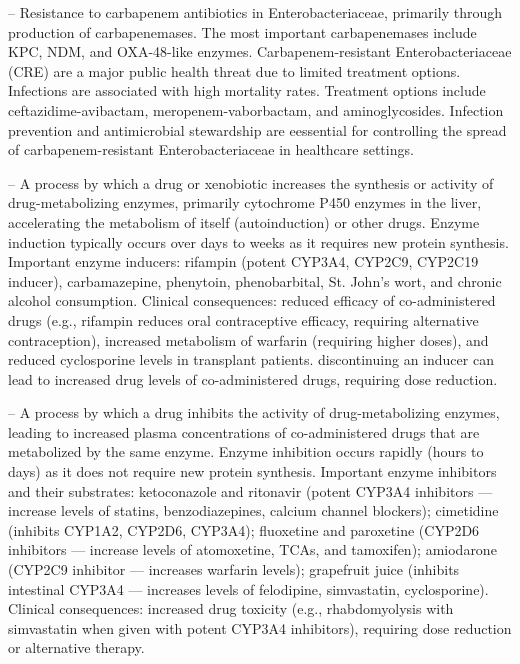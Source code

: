 -- Resistance to carbapenem antibiotics in Enterobacteriaceae, primarily through production of carbapenemases. The most important carbapenemases include KPC, NDM, and OXA-48-like enzymes. Carbapenem-resistant Enterobacteriaceae (CRE) are a major public health threat due to limited treatment options. Infections are associated with high mortality rates. Treatment options include ceftazidime-avibactam, meropenem-vaborbactam, and aminoglycosides. Infection prevention and antimicrobial stewardship are eessential for controlling the spread of carbapenem-resistant Enterobacteriaceae in healthcare settings.

-- A process by which a drug or xenobiotic increases the synthesis or activity of drug-metabolizing enzymes, primarily cytochrome P450 enzymes in the liver, accelerating the metabolism of itself (autoinduction) or other drugs. Enzyme induction typically occurs over days to weeks as it requires new protein synthesis. Important enzyme inducers: rifampin (potent CYP3A4, CYP2C9, CYP2C19 inducer), carbamazepine, phenytoin, phenobarbital, St. John's wort, and chronic alcohol consumption. Clinical consequences: reduced efficacy of co-administered drugs (e.g., rifampin reduces oral contraceptive efficacy, requiring alternative contraception), increased metabolism of warfarin (requiring higher doses), and reduced cyclosporine levels in transplant patients. discontinuing an inducer can lead to increased drug levels of co-administered drugs, requiring dose reduction.

-- A process by which a drug inhibits the activity of drug-metabolizing enzymes, leading to increased plasma concentrations of co-administered drugs that are metabolized by the same enzyme. Enzyme inhibition occurs rapidly (hours to days) as it does not require new protein synthesis. Important enzyme inhibitors and their substrates: ketoconazole and ritonavir (potent CYP3A4 inhibitors — increase levels of statins, benzodiazepines, calcium channel blockers); cimetidine (inhibits CYP1A2, CYP2D6, CYP3A4); fluoxetine and paroxetine (CYP2D6 inhibitors — increase levels of atomoxetine, TCAs, and tamoxifen); amiodarone (CYP2C9 inhibitor — increases warfarin levels); grapefruit juice (inhibits intestinal CYP3A4 — increases levels of felodipine, simvastatin, cyclosporine). Clinical consequences: increased drug toxicity (e.g., rhabdomyolysis with simvastatin when given with potent CYP3A4 inhibitors), requiring dose reduction or alternative therapy.

